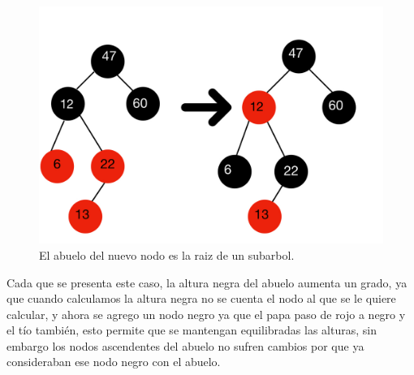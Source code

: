 \documentclass[11pt]{article}
\begin{document}
\begin{itemize}
\begin{figure}
    \centering
    \includegraphics[scale=.2]{IMG-2100.jpg}
    \caption{El abuelo del nuevo nodo es la raiz de un subarbol.}
    \label{}
 \end{figure}
 Cada que se presenta este caso, la altura negra del abuelo aumenta un grado, ya que cuando calculamos la altura negra no se cuenta el nodo al que se le quiere calcular, y ahora se agrego un nodo negro ya que el papa paso de rojo a negro y el tío también, esto permite que se mantengan  equilibradas las alturas, sin embargo los nodos ascendentes del abuelo no sufren cambios por que ya consideraban ese nodo negro con el abuelo.
\end{itemize}
\end{document}
